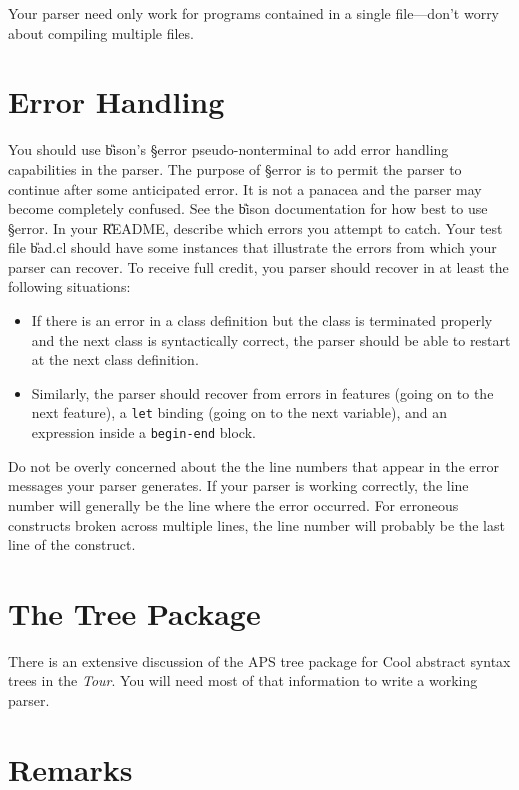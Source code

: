 Your parser need only work for programs contained in a single file---don't
worry about compiling multiple files.

\section{Error Handling}

You should use \U{bison}'s \S{error} pseudo-nonterminal to add error
handling capabilities in the parser.  The purpose of \S{error} is to
permit the parser to continue after some anticipated error.  It is not
a panacea and the parser may become completely confused.  See the
\U{bison} documentation for how best to use \S{error}.  In your
\U{README}, describe which errors you attempt to catch.  Your test
file \U{bad.cl} should have some instances that illustrate the errors
from which your parser can recover.  To receive full credit, you
parser should recover in at least the following situations:
\begin{itemize}

\item If there is an error in a class definition but the class is
terminated properly and the next class is syntactically correct,
 the parser should be able to restart at the next class definition.

\item Similarly, the parser should recover from errors in features
(going on to the next feature), a {\tt let} binding (going on to the next
variable), and an expression inside a {\tt begin-end} block.

\end{itemize}

Do not be overly concerned about the the line numbers that appear in
the error messages your parser generates.  If your parser is working
correctly, the line number will generally be the line where the error
occurred.  For erroneous constructs broken across multiple lines, the
line number will probably be the last line of the construct.

\section{The Tree Package}
\label{sec-tree}

There is an extensive discussion of the APS tree package for Cool abstract
syntax trees in the {\em Tour}.  You will need most of that information
to write a working parser.

\section {Remarks}

